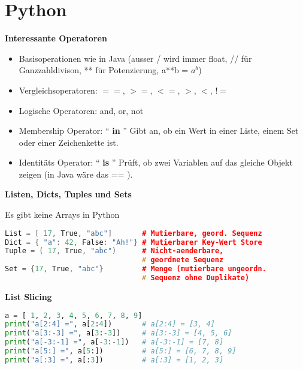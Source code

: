 \section{Python}

\begin{sectionbox}

\textbf{Interessante Operatoren}
\begin{itemize}
    \item Basisoperationen wie in Java (ausser / wird immer float, // für Ganzzahldivison, ** für Potenzierung, a**b = $a^{b}$)
    \item Vergleichsoperatoren: $==$, $>=$, $<=$, $>$, $<$, !$=$
    \item Logische Operatoren: and, or, not
    \item Membership Operator: “ \textbf{in} ” Gibt an, ob ein Wert in einer Liste, einem Set oder einer Zeichenkette ist.
    \item Identitäts Operator: “ \textbf{is} ” Prüft, ob zwei Variablen auf das gleiche Objekt zeigen (in Java wäre das == ).
\end{itemize}\medskip

\textbf{Listen, Dicts, Tuples und Sets}\par
Es gibt keine Arrays in Python\par\vspace{-4px}
\begin{lstlisting}[language=C++]
List = [ 17, True, "abc"]       # Mutierbare, geord. Sequenz
Dict = { "a": 42, False: "Ah!"} # Mutierbarer Key-Wert Store
Tuple = ( 17, True, "abc")      # Nicht-aenderbare,
                                # geordnete Sequenz
Set = {17, True, "abc"}         # Menge (mutierbare ungeordn.
                                # Sequenz ohne Duplikate)
\end{lstlisting}

\textbf{List Slicing}\vspace{-4px}
\begin{lstlisting}[language=Python]
a = [ 1, 2, 3, 4, 5, 6, 7, 8, 9]
print("a[2:4] =", a[2:4])       # a[2:4] = [3, 4]
print("a[3:-3] =", a[3:-3])     # a[3:-3] = [4, 5, 6]
print("a[-3:-1] =", a[-3:-1])   # a[-3:-1] = [7, 8]
print("a[5:] =", a[5:])         # a[5:] = [6, 7, 8, 9]
print("a[:3] =", a[:3])         # a[:3] = [1, 2, 3]
\end{lstlisting}


\end{sectionbox}
